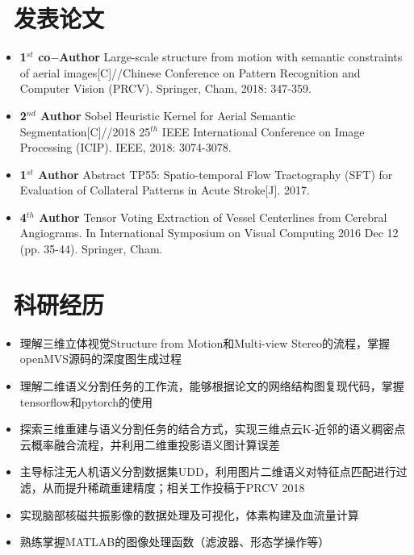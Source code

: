 \documentclass{resume}
\begin{document}
\section{\faBookmark\ 发表论文}
\begin{itemize}
    \item \textbf{1$^{st}$ co$-$Author} Large-scale structure from motion with semantic constraints of aerial images[C]//Chinese Conference on Pattern Recognition and Computer Vision (PRCV). Springer, Cham, 2018: 347-359.
	\item \textbf{2$^{nd}$ Author} Sobel Heuristic Kernel for Aerial Semantic Segmentation[C]//2018 25$^{th}$ IEEE International Conference on Image Processing (ICIP). IEEE, 2018: 3074-3078.
	\item \textbf{1$^{st}$ Author} Abstract TP55: Spatio-temporal Flow Tractography (SFT) for Evaluation of Collateral Patterns in Acute Stroke[J]. 2017.
	\item \textbf{4$^{th}$ Author} Tensor Voting Extraction of Vessel Centerlines from Cerebral Angiograms. In International Symposium on Visual Computing 2016 Dec 12 (pp. 35-44). Springer, Cham. 
\end{itemize}


\section{\faFlask\ 科研经历}

\begin{itemize}
    \item 理解三维立体视觉Structure from Motion和Multi-view Stereo的流程，掌握openMVS源码的深度图生成过程
    \item 理解二维语义分割任务的工作流，能够根据论文的网络结构图复现代码，掌握tensorflow和pytorch的使用
    \item 探索三维重建与语义分割任务的结合方式，实现三维点云K-近邻的语义稠密点云概率融合流程，并利用二维重投影语义图计算误差
	\item 主导标注无人机语义分割数据集UDD，利用图片二维语义对特征点匹配进行过滤，从而提升稀疏重建精度；相关工作投稿于PRCV 2018
\end{itemize}

\begin{itemize}[parsep=0.5ex]
  \item 实现脑部核磁共振影像的数据处理及可视化，体素构建及血流量计算
  \item 熟练掌握MATLAB的图像处理函数（滤波器、形态学操作等）
\end{itemize}
\end{document}
